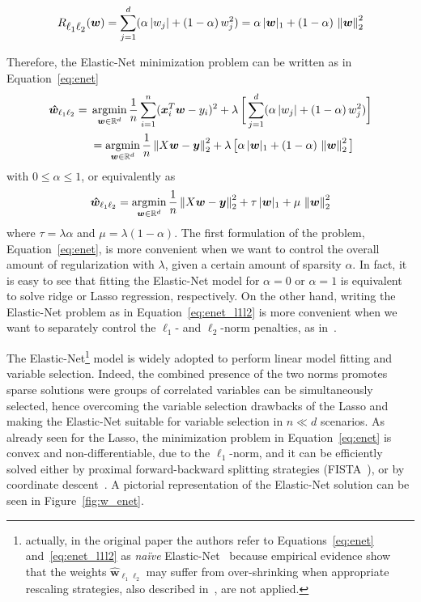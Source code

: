 			\begin{equation}\label{eq:l1l2}
				R_{\mbox{$\ell_1\ell_2$}}(\bm{w}) = \sum_{j=1}^d (\alpha\,|w_j| + (1-\alpha)\,w_j^2) = \alpha\,|\bm{w}|_1 + (1-\alpha)\,\left\lVert\bm{w}\right\rVert_2^2
			\end{equation}

			Therefore, the Elastic-Net minimization problem can be written as in Equation~\eqref{eq:enet}
			\begin{equation} \label{eq:enet}
				\begin{aligned}
				\bm{\hat w}_{\ell_1\ell_2} = {} & \mathop{\mathrm{argmin}}\limits_{\bm{w} \in \mathbb{R}^d} \frac{1}{n} \sum_{i=1}^n (\bm{x}_i^T\bm{w} - y_i)^2 + \lambda\,\bigg[ \sum_{j=1}^d (\alpha\,|w_j| + (1-\alpha)\,w_j^2) \bigg] \\
				& = \mathop{\mathrm{argmin}}\limits_{\bm{w} \in \mathbb{R}^d} \frac{1}{n} \left\lVert X\bm{w} - \bm{y}\right\rVert_2^2 + \lambda\,\big[ \alpha\,|\bm{w}|_1 + (1-\alpha)\,\left\lVert\bm{w}\right\rVert_2^2 \big]
			\end{aligned}
		  \end{equation}
			with $0 \leq \alpha \leq 1$, or equivalently as
			\begin{equation} \label{eq:enet_l1l2}
			\bm{\hat w}_{\ell_1\ell_2} = \mathop{\mathrm{argmin}}\limits_{\bm{w} \in \mathbb{R}^d} \frac{1}{n} \left\lVert X\bm{w} - \bm{y}\right\rVert_2^2 + \tau\,|\bm{w}|_1 + \mu\,\left\lVert\bm{w}\right\rVert_2^2
			\end{equation}
			where $\tau = \lambda\alpha$ and $\mu = \lambda(1-\alpha)$. The first formulation of the problem, Equation~\eqref{eq:enet}, is more convenient when we want to control the overall amount of regularization with $\lambda$, given a certain amount of sparsity $\alpha$. In fact, it is easy to see that fitting the Elastic-Net model for $\alpha=0$ or $\alpha=1$ is equivalent to solve ridge or Lasso regression, respectively. On the other hand, writing the Elastic-Net problem as in Equation~\eqref{eq:enet_l1l2} is more convenient when we want to separately control the $\ell_1$- and $\ell_2$-norm penalties, as in~\cite{de2009regularized}.

			The Elastic-Net\footnote{actually, in the original paper the authors refer to Equations~\eqref{eq:enet} and~\eqref{eq:enet_l1l2} as \textit{na\"ive} Elastic-Net~\cite{zou2005regularization} because empirical evidence show that the weights $\bm{\hat w}_{\ell_1\ell_2}$ may suffer from over-shrinking when appropriate rescaling strategies, also described in~\cite{de2009regularized},  are not applied.} model is widely adopted to perform linear model fitting and variable selection. Indeed, the combined presence of the two norms promotes sparse solutions were groups of correlated variables can be simultaneously selected, hence overcoming the variable selection drawbacks of the Lasso and making the Elastic-Net suitable for variable selection in $n \ll d$ scenarios.
			As already seen for the Lasso, the minimization problem in Equation~\eqref{eq:enet} is convex and non-differentiable, due to the $\ell_1$-norm, and it can be efficiently solved either by proximal forward-backward splitting strategies (\eg FISTA~\cite{beck2009fast}), or by coordinate descent~\cite{wu2008coordinate}. A pictorial representation of the Elastic-Net solution can be seen in Figure~\ref{fig:w_enet}.


